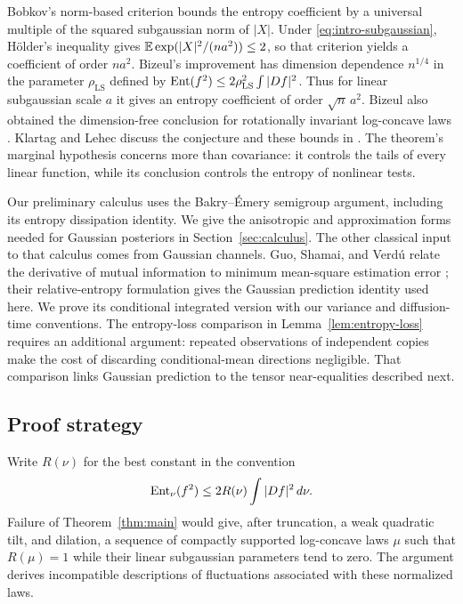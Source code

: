 Bobkov's norm-based criterion
\cite[Theorem~1.3]{Bobkov1999} bounds the entropy coefficient by
a universal multiple of the squared subgaussian norm of $|X|$.
Under \eqref{eq:intro-subgaussian}, H\"older's inequality gives
$\mathbb E\exp(|X|^2/(na^2))\le2$, so that criterion yields a coefficient
of order $na^2$.  Bizeul's improvement
\cite[Theorem~4]{Bizeul2026} has dimension dependence $n^{1/4}$
in the parameter $\rho_{\mathrm{LS}}$ defined by
$\operatorname{Ent}(f^2)\le2\rho_{\mathrm{LS}}^2\int|Df|^2$.
Thus for linear subgaussian scale $a$ it gives an entropy coefficient
of order $\sqrt n\,a^2$.
Bizeul also obtained the dimension-free conclusion for rotationally
invariant log-concave laws \cite[Theorem~8]{Bizeul2026}.
Klartag and Lehec discuss the conjecture and these bounds in
\cite[Section~8.3, Conjecture~76 and Theorem~77]{KlartagLehec2024}.
The theorem's marginal hypothesis concerns more than covariance:
it controls the tails of every linear function, while its conclusion
controls the entropy of nonlinear tests.

Our preliminary calculus uses the Bakry--\'Emery semigroup argument,
including its entropy dissipation identity.  We give the anisotropic
and approximation forms needed for Gaussian posteriors in
Section~\ref{sec:calculus}.  The other classical input to that
calculus comes from Gaussian channels.  Guo, Shamai, and Verd\'u
relate the derivative of mutual information to minimum mean-square
estimation error \cite[Theorem~2]{GuoShamaiVerdu2005}; their
relative-entropy formulation \cite[Theorem~5, Equation~(66)]{GuoShamaiVerdu2005}
gives the Gaussian prediction identity used here.  We prove its
conditional integrated version with our variance and diffusion-time
conventions.  The entropy-loss comparison in
Lemma~\ref{lem:entropy-loss} requires an additional argument:
repeated observations of independent copies make the cost of discarding
conditional-mean directions negligible.  That comparison links
Gaussian prediction to the tensor near-equalities described next.

\subsection{Proof strategy}

Write \(R(\nu)\) for the best constant in the convention
\begin{equation}\label{eq:intro-lsi-convention}
 \operatorname{Ent}_\nu(f^2)\le2R(\nu)\int|Df|^2\,d\nu.
\end{equation}
Failure of Theorem~\ref{thm:main} would give, after truncation,
a weak quadratic tilt, and dilation, a sequence of compactly
supported log-concave laws \(\mu\) such that
\(R(\mu)=1\) while their linear subgaussian parameters tend to zero.
The argument derives incompatible descriptions of fluctuations
associated with these normalized laws.

